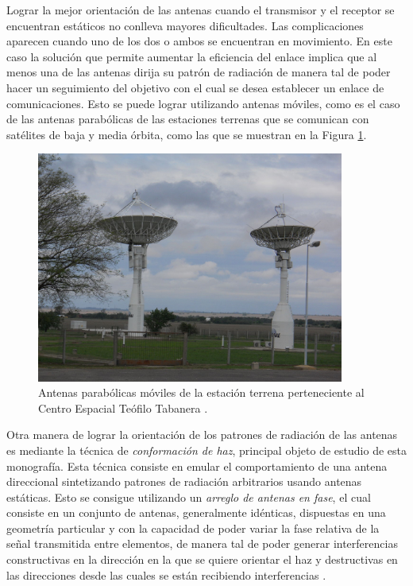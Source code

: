 Lograr la mejor orientación de las antenas cuando el transmisor y el receptor se encuentran estáticos no conlleva mayores dificultades. Las complicaciones aparecen cuando uno de los dos o ambos se encuentran en movimiento. En este caso la solución que permite aumentar la eficiencia del enlace implica que al menos una de las antenas dirija su patrón de radiación de manera tal de poder hacer un seguimiento del objetivo con el cual se desea establecer un enlace de comunicaciones. Esto se puede lograr utilizando antenas móviles, como es el caso de las antenas parabólicas de las estaciones terrenas que se comunican con satélites de baja y media órbita, como las que se muestran en la Figura \ref{fig:beamforming_cordoba}.

\begin{figure}[ht!]
    \centering
    \includegraphics[width=0.9\textwidth]{images/02-Beamforming/estacionterrenacordoba.jpg}
    \caption{Antenas parabólicas móviles de la estación terrena perteneciente al Centro Espacial Teófilo Tabanera \cite{bib:estacionterrena_cordoba}.}
    \label{fig:beamforming_cordoba}
\end{figure}


Otra manera de lograr la orientación de los patrones de radiación de las antenas es mediante la técnica de \emph{conformación de haz}, principal objeto de estudio de esta monografía. Esta técnica consiste en emular el comportamiento de una antena direccional sintetizando patrones de radiación arbitrarios usando antenas estáticas. Esto se consigue utilizando un \emph{arreglo de antenas en fase}, el cual consiste en un conjunto de antenas, generalmente idénticas, dispuestas en una geometría particular y con la capacidad de poder variar la fase relativa de la señal transmitida entre elementos, de manera tal de poder generar interferencias constructivas en la dirección en la que se quiere orientar el haz y destructivas en las direcciones desde las cuales se están recibiendo interferencias \cite{bib:Balanis_ch6}.

